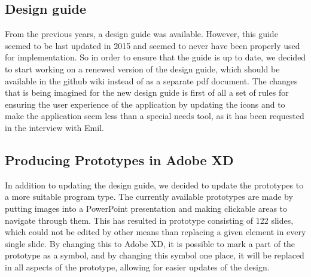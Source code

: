 \subsection{Design guide}
From the previous years, a design guide was available.
However, this guide seemed to be last updated in 2015 and seemed to never have been properly used for implementation.
So in order to ensure that the guide is up to date, we decided to start working on a renewed version of the design guide, which should be available in the github wiki instead of as a separate pdf document.
The changes that is being imagined for the new design guide is first of all a set of rules for ensuring the user experience of the application by updating the icons and to make the application seem less than a special needs tool, as it has been requested in the interview with Emil.

\subsection{Producing Prototypes in Adobe XD}
In addition to updating the design guide, we decided to update the prototypes to a more suitable program type.
The currently available prototypes are made by putting images into a PowerPoint presentation and making clickable areas to navigate through them.
This has resulted in prototype consisting of 122 slides, which could not be edited by other means than replacing a given element in every single slide.
By changing this to Adobe XD, it is possible to mark a part of the prototype as a symbol, and by changing this symbol one place, it will be replaced in all aspects of the prototype, allowing for easier updates of the design.
